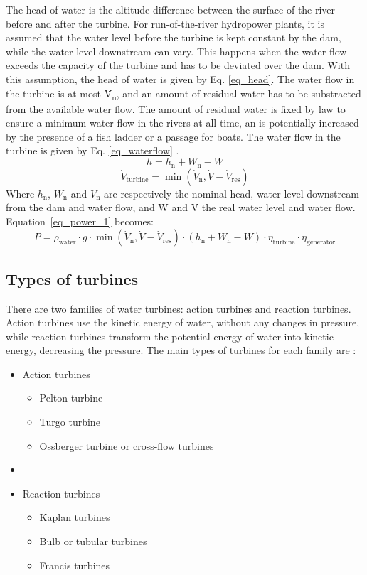 The head of water is the altitude difference between the surface of the river before and after the turbine. For run-of-the-river hydropower plants, it is assumed that the water level before the turbine is kept constant by the dam, while the water level downstream can vary. This happens when the water flow exceeds the capacity of the turbine and has to be deviated over the dam. With this assumption, the head of water is given by Eq. \eqref{eq_head}. The water flow in the turbine is at most \.{V}\textsubscript{n}, and an amount of residual water has to be substracted from the available water flow. The amount of residual water is fixed by law to ensure a minimum water flow in the rivers at all time, an is potentially increased by the presence of a fish ladder or a passage for boats. The water flow in the turbine is given by Eq. \eqref{eq_waterflow} \cite{quaschning}.
\begin{equation}
\label{eq_head} 
 h = h_\mathrm{n} +W_\mathrm{n}-W
\end{equation}
\begin{equation}
\label{eq_waterflow} 
 \dot{V}_\mathrm{turbine} = \min(\dot{V}_\mathrm{n},\dot{V}-\dot{V}_\mathrm{res})
\end{equation}
Where $h_\mathrm{n}$, $W_\mathrm{n}$ and $\dot{V}_\mathrm{n}$ are respectively the nominal head, water level downstream from the dam and water flow, and W and \.{V} the real water level and water flow. Equation~\eqref{eq_power_1} becomes:
\begin{equation}
 \label{eq_power_2} 
 P = \rho_\mathrm{water} \cdot g \cdot \min(\dot{V}_\mathrm{n},\dot{V}-\dot{V}_\mathrm{res}) \cdot (h_\mathrm{n} +W_\mathrm{n}-W) \cdot \eta_\mathrm{turbine} \cdot \eta_\mathrm{generator}
\end{equation}

\subsection{Types of turbines}

There are two families of water turbines: action turbines and reaction turbines. Action turbines use the kinetic energy of water, without any changes in pressure, while reaction turbines transform the potential energy of water into kinetic energy, decreasing the pressure. The main types of turbines for each family are \cite{quaschning}:
\begin{itemize}
\item Action turbines
 \begin{itemize}
  \item Pelton turbine
  \item Turgo turbine
  \item Ossberger turbine or cross-flow turbines
 \end{itemize}
 \item[~] 
 \item Reaction turbines
 \begin{itemize}
  \item Kaplan turbines
  \item Bulb or tubular turbines
  \item Francis turbines
 \end{itemize}
\end{itemize}

